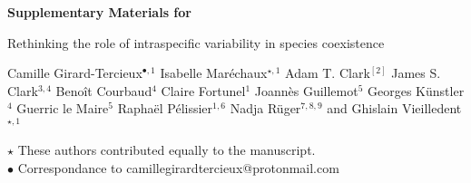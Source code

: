
\begin{center}
  \Large{\textbf{Supplementary Materials for}}
\end{center}

\vspace{1cm}

\begin{center}
  \LARGE{Rethinking the role of intraspecific variability in species coexistence}
\end{center}

\vspace{1cm}

\begin{center}
  \large{
  Camille Girard-Tercieux$^{\bullet, 1}$ \hspace{0.5cm} Isabelle Maréchaux$^{\star, 1}$ \hspace{0.5cm} Adam T. Clark$^[2]$ \hspace{0.5cm} James S. Clark$^{3,4}$ \hspace{0.5cm} Benoît Courbaud$^{4}$ \hspace{0.5cm} Claire Fortunel$^{1}$ \hspace{0.5cm} Joannès Guillemot$^{5}$ \hspace{0.5cm} Georges Künstler$^{4}$ \hspace{0.5cm} Guerric le Maire$^{5}$ \hspace{0.5cm} Raphaël Pélissier$^{1, 6}$ \hspace{0.5cm} Nadja Rüger$^{7, 8, 9}$ \hspace{0.5cm} and Ghislain Vieilledent$^{\star, 1}$
  }
\end{center}

\vspace{0.5cm}

\begin{center}
  $\star$ These authors contributed equally to the manuscript.\\
  $\bullet$ Correspondance to camillegirardtercieux@protonmail.com
\end{center}

\vspace{0.5cm}

